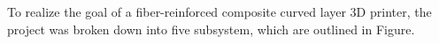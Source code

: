 To realize the goal of a fiber-reinforced composite curved layer 3D printer, the project was broken down into five subsystem, which are outlined in Figure.

%
